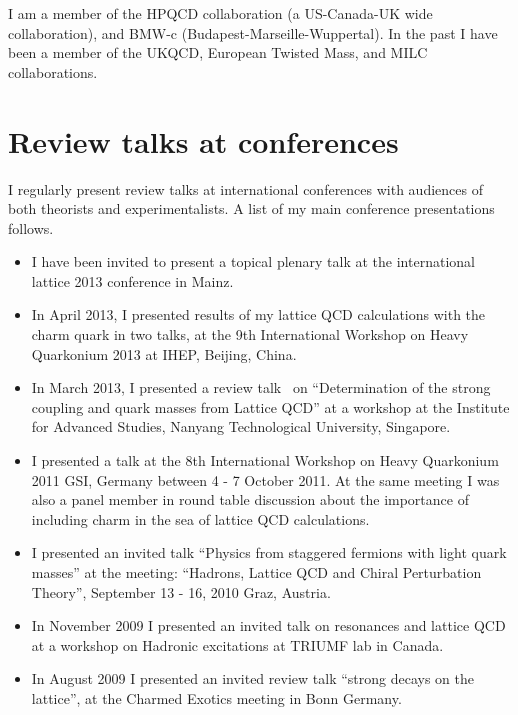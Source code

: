 \documentclass[12pt]{article}
\begin{document}
I am a member of the
HPQCD collaboration (a US-Canada-UK wide collaboration),
and BMW-c (Budapest-Marseille-Wuppertal).
In the past I have been a member of the UKQCD,
European Twisted Mass,
and MILC collaborations.

\section{Review talks at conferences}

I regularly present review talks at international
conferences with audiences of both theorists and experimentalists.
A list of my main conference presentations follows.

\begin{itemize}

\item I have been invited to present a topical plenary
      talk at the international lattice 2013 conference
      in Mainz.

\item In April 2013, I presented results of my lattice
      QCD calculations with the charm quark in two talks, at 
the 9th International Workshop on Heavy Quarkonium 2013 
at IHEP, Beijing, China.

\item In March 2013, I presented a 
review talk~\cite{McNeile:2013rga} on 
``Determination of the strong coupling and quark 
masses from Lattice QCD'' at a workshop
at the Institute for Advanced Studies, Nanyang Technological
University, Singapore.


\item I presented a talk at the 
8th International Workshop on Heavy Quarkonium 2011 
GSI, Germany between 4 - 7 October 2011. At the same meeting I
was also a panel member in round table discussion about the
importance of including charm in the sea of lattice QCD calculations.

\item I presented an invited talk 
   ``Physics from staggered fermions with light quark masses''
at the meeting:
``Hadrons, Lattice QCD and Chiral Perturbation Theory'',
September 13 - 16, 2010 Graz, Austria.

\item In November 2009 I presented an invited talk
      on resonances and lattice QCD at a
      workshop on Hadronic excitations at TRIUMF lab in Canada.

\item In August 2009 I presented an invited review talk
      ``strong decays on the lattice'',
       at the Charmed Exotics meeting in Bonn Germany.



\end{itemize}
\end{document}
